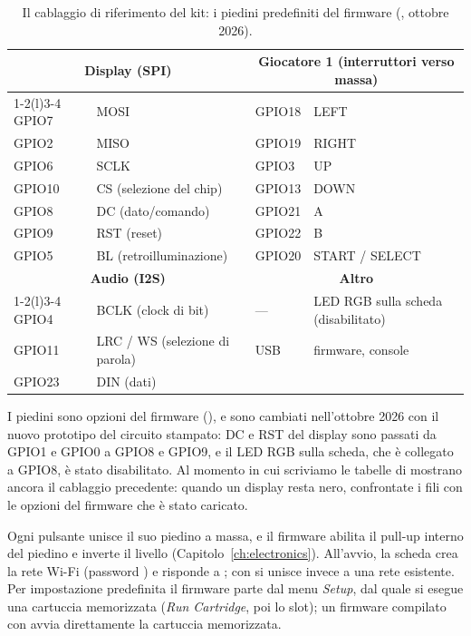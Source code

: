 \begin{table}[htb]
\centering\small
\caption{Il cablaggio di riferimento del kit: i piedini predefiniti del firmware (, ottobre 2026).}\label{tab:prg:pins}
\begin{tabular}{@{}ll@{\qquad\qquad}ll@{}}
\toprule
\multicolumn{2}{c}{\textbf{Display (SPI)}} & \multicolumn{2}{c}{\textbf{Giocatore 1 (interruttori verso massa)}}\\
\cmidrule(r){1-2}\cmidrule(l){3-4}
GPIO7 & MOSI & GPIO18 & LEFT\\
GPIO2 & MISO & GPIO19 & RIGHT\\
GPIO6 & SCLK & GPIO3 & UP\\
GPIO10 & CS (selezione del chip) & GPIO13 & DOWN\\
GPIO8 & DC (dato/comando) & GPIO21 & A\\
GPIO9 & RST (reset) & GPIO22 & B\\
GPIO5 & BL (retroilluminazione) & GPIO20 & START / SELECT\\
\midrule
\multicolumn{2}{c}{\textbf{Audio (I2S)}} & \multicolumn{2}{c}{\textbf{Altro}}\\
\cmidrule(r){1-2}\cmidrule(l){3-4}
GPIO4 & BCLK (clock di bit) & --- & LED RGB sulla scheda (disabilitato)\\
GPIO11 & LRC / WS (selezione di parola) & USB & firmware, console\\
GPIO23 & DIN (dati) & & \\
\bottomrule
\end{tabular}
\end{table}

I piedini sono opzioni del firmware (), e sono cambiati
nell'ottobre 2026 con il nuovo prototipo del circuito stampato: DC e RST del
display sono passati da GPIO1 e GPIO0 a GPIO8 e GPIO9, e il LED RGB sulla
scheda, che è collegato a GPIO8, è stato disabilitato. Al momento in cui
scriviamo le tabelle di  mostrano ancora il
cablaggio precedente: quando un display resta nero, confrontate i fili con le
opzioni del firmware che è stato caricato.

Ogni pulsante unisce il suo piedino a massa, e il firmware abilita il pull-up
interno del piedino e inverte il livello (Capitolo~\ref{ch:electronics}).
All'avvio, la scheda crea la rete Wi-Fi  (password
) e risponde a ; con
 si unisce invece a una rete esistente. Per
impostazione predefinita il firmware parte dal menu \emph{Setup}, dal quale si
esegue una cartuccia memorizzata (\emph{Run Cartridge}, poi lo slot); un
firmware compilato con  avvia direttamente la
cartuccia memorizzata.

